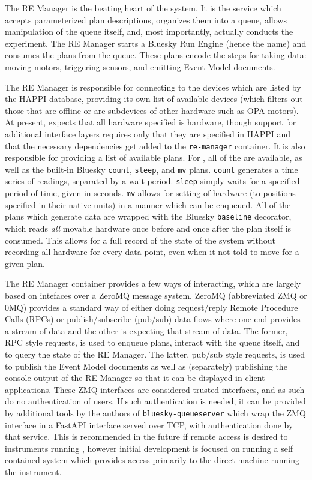 The RE Manager is the beating heart of the \biab system.
It is the service which accepts parameterized plan descriptions, organizes them into a queue, allows manipulation of the queue itself, and, most importantly, actually conducts the experiment.
The RE Manager starts a Bluesky Run Engine (hence the name) and consumes the plans from the queue.
These plans encode the steps for taking data: moving motors, triggering sensors, and emitting Event Model documents.

The RE Manager is responsible for connecting to the devices which are listed by the HAPPI database, providing its own list of available devices (which filters out those that are offline or are subdevices of other hardware such as OPA motors).
At present, \biab expects that all hardware specified is \yaq{} hardware, though support for additional interface layers requires only that they are specified in HAPPI and that the necessary dependencies get added to the \texttt{re-manager} container.
It is also responsible for providing a list of available plans.
For \biab, all of the \wrightplans are available, as well as the built-in Bluesky \texttt{count}, \texttt{sleep}, and \texttt{mv} plans.
\texttt{count} generates a time series of readings, separated by a wait period.
\texttt{sleep} simply waits for a specified period of time, given in seconds.
\texttt{mv} allows for setting of hardware (to positions specified in their native units) in a manner which can be enqueued.
All of the plans which generate data are wrapped with the Bluesky \texttt{baseline} decorator, which reads \textit{all} movable hardware once before and once after the plan itself is consumed.
This allows for a full record of the state of the system without recording all hardware for every data point, even when it not told to move for a given plan.

The RE Manager container provides a few ways of interacting, which are largely based on intefaces over a ZeroMQ\cite{Hintjens_2013} message system.
ZeroMQ (abbreviated ZMQ or 0MQ) provides a standard way of either doing request/reply Remote Procedure Calls (RPCs) or publish/subscribe (pub/sub) data flows where one end provides a stream of data and the other is expecting that stream of data.
The former, RPC style requests, is used to enqueue plans, interact with the queue itself, and to query the state of the RE Manager.
The latter, pub/sub style requests, is used to publish the Event Model documents as well as (separately) publishing the console output of the RE Manager so that it can be displayed in client applications.
These ZMQ interfaces are considered trusted interfaces, and as such do no authentication of users.
If such authentication is needed, it can be provided by additional tools by the authors of \texttt{bluesky-queueserver} which wrap the ZMQ interface in a FastAPI\cite{fastapi} interface served over TCP, with authentication done by that service.
This is recommended in the future if remote access is desired to instruments running \biab, however initial development is focused on running a self contained system which provides access primarily to the direct machine running the instrument.

